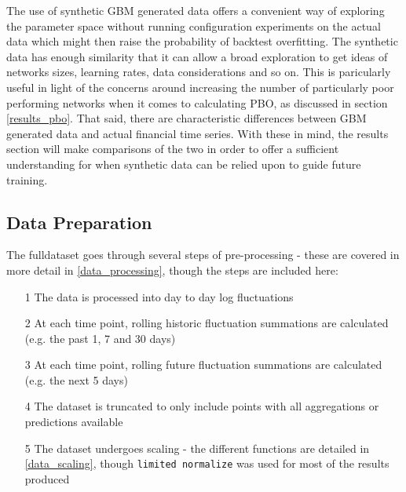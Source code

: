 \documentclass[a4paper,11pt,oneside]{article}
\theoremstyle{plain}
\theoremstyle{definition}
\begin{document}
	The use of synthetic GBM generated data offers a convenient way of exploring the parameter space without running configuration experiments on the actual data which might then raise the probability of backtest overfitting. The synthetic data has enough similarity that it can allow a broad exploration to get ideas of networks sizes, learning rates, data considerations and so on. This is paricularly useful in light of the concerns around increasing the number of particularly poor performing networks when it comes to calculating PBO, as discussed in section \ref{results_pbo}. That said, there are characteristic differences between GBM generated data and actual financial time series. With these in mind, the results section will make comparisons of the two in order to offer a sufficient understanding for when synthetic data can be relied upon to guide future training.
	
	\subsection{Data Preparation}\label{proc_dataprep}
	
	The fulldataset goes through several steps of pre-processing - these are covered in more detail in \ref{data_processing}, though the steps are included here:
	
	\begin{itemize}
		\item[1] The data is processed into day to day log fluctuations
		\item[2] At each time point, rolling historic fluctuation summations are calculated (e.g. the past 1, 7 and 30 days)
		\item[3] At each time point, rolling future fluctuation summations are calculated (e.g. the next 5 days)
		\item[4] The dataset is truncated to only include points with all aggregations or predictions available
		\item[5] The dataset undergoes scaling - the different functions are detailed in \ref{data_scaling}, though \texttt{limited normalize} was used for most of the results produced
	\end{itemize}
	
\end{document}
